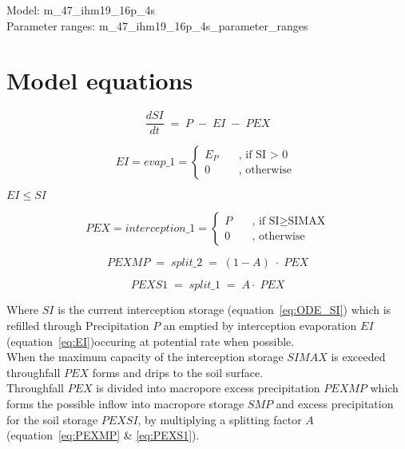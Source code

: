 \documentclass[11pt,color]{tudbook}
\begin{document}
\begin{onehalfspacing}
Model: m\_47\_ihm19\_16p\_4s \\
Parameter ranges: m\_47\_ihm19\_16p\_4s\_parameter\_ranges

\section{Model equations}

\begin{equation}
\label{eq:ODE_SI}
\frac{dSI}{dt}\;=\;P\;-\;EI\;-\;PEX
\end{equation}

\begin{equation}
\label{eq:EI}
 EI = evap\_1 = 
\begin{cases}
    E_P&\quad \text{, if SI > 0}  \\
    0  &\quad  \text{, otherwise }
  \end{cases}
\end{equation}
\begin{center}
$EI \leq SI$
\end{center}

\begin{equation}
\label{eq:PEX}
 PEX = interception\_1 = 
\begin{cases}
    P  & \quad \text{, if SI} \geq \text{SIMAX}  \\
    0  & \quad \text{, otherwise }
  \end{cases}
\end{equation}

\begin{equation}
\label{eq:PEXMP}
PEXMP\;=\;split\_2\;=\;(1-A)\;\cdot\;PEX
\end{equation}

\begin{equation}
\label{eq:PEXS1}
PEXS1\;=\;split\_1\;=\;A\cdot\;PEX
\end{equation}

Where $SI$ is the current interception
storage (equation~\ref{eq:ODE_SI}) which is refilled through
Precipitation $P$ an emptied by interception evaporation $EI$ (equation~\ref{eq:EI})occuring
at potential rate when possible.\\
When the maximum capacity of the interception storage $SIMAX$ is  exceeded throughfall $PEX$ forms and drips to the soil surface.\\
Throughfall $PEX$ is divided into macropore excess precipitation $PEXMP$ which forms the possible inflow into macropore storage $SMP$ and excess precipitation for the soil storage $PEXSI$, by multiplying a splitting factor $A$ (equation~\ref{eq:PEXMP} \& \ref{eq:PEXS1}).


\end{onehalfspacing}
\end{document}
